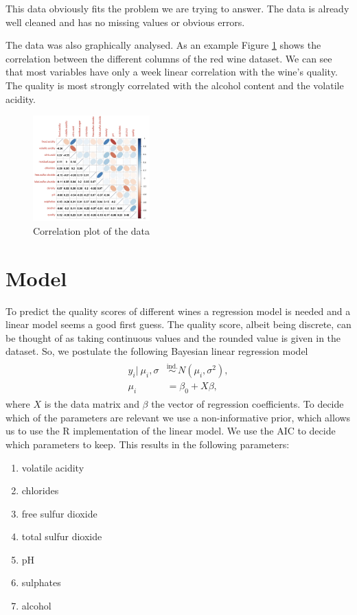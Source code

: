 \documentclass[a4paper,11pt]{article}
\begin{document}
This data obviously fits the problem we are trying to answer. The data is already well cleaned and has no missing values or obvious errors.

The data was also graphically analysed. As an example Figure \ref{fig:corr} shows the correlation between the different columns of the red wine dataset. We can see that most variables have only a week linear correlation with the wine's quality. The quality is most strongly correlated with the alcohol content and the volatile acidity.

\begin{figure}[H]
\centering
	\includegraphics[width=0.4\textwidth]{corr.jpeg}
	\caption{Correlation plot of the data}
	\label{fig:corr}
\end{figure}


\section{Model}

To predict the quality scores of different wines a regression model is needed and a linear model seems a good first guess. The quality score, albeit being discrete, can be thought of as taking continuous values and the rounded value is given in the dataset. So, we postulate the following Bayesian linear regression model
\begin{align}
\begin{split}
y_i |\ \mu_i, \sigma &\stackrel{\text{ind.}}{\sim} N(\mu_i, \sigma^2),\\
\mu_i &= \beta_0 + X \beta,
\end{split}
\end{align}
where $X$ is the data matrix and $\beta$ the vector of regression coefficients. To decide which of the parameters are relevant we use a non-informative prior, which allows us to use the R implementation of the linear model. We use the AIC to decide which parameters to keep. This results in the following parameters:
\begin{multicols}{3}
\begin{enumerate}
\item volatile acidity 
\item chlorides 
\item free sulfur dioxide 
\item total sulfur dioxide 
\item pH 
\item sulphates 
\item alcohol 
\end{enumerate}
\end{multicols}
\end{document}
